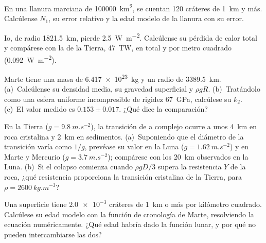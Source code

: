 \begin{exercise}[$\star$]\label{exo:b3:planetary-interiors-surfaces:3}
En una llanura marciana de \qty{100000}{km^2}, se cuentan 120 cráteres de \qty{1}{km} y
más. Calcúlense $N_1$, su error relativo y la edad modelo de la
llanura con su error.
\end{exercise}

\begin{exercise}[$\star$]\label{exo:b3:planetary-interiors-surfaces:4}
Io, de radio \qty{1821.5}{km}, pierde \qty{2.5}{W.m^{-2}}. Calcúlense su
pérdida de calor total y compárese con la de la Tierra, \qty{47}{TW}, en total y
por metro cuadrado (\qty{0.092}{W.m^{-2}}).
\end{exercise}

\begin{exercise}[$\star\star$]\label{exo:b3:planetary-interiors-surfaces:5}
Marte tiene una masa de \qty{6.417e23}{kg} y un radio de \qty{3389.5}{km}.
(a)~Calcúlense su densidad media, su gravedad superficial y $\rho gR$.
(b)~Tratándolo como una esfera uniforme incompresible de rigidez
\qty{67}{GPa}, calcúlese su  $k_2$. (c)~El valor medido es
$0.153 \pm 0.017$. ¿Qué dice la comparación?
\end{exercise}

\begin{exercise}[$\star\star$]\label{exo:b3:planetary-interiors-surfaces:6}
En la Tierra ($g = \qty{9.8}{m.s^{-2}}$), la transición de  a complejo
ocurre a unos \qty{4}{km} en roca cristalina y \qty{2}{km} en
sedimentos. (a)~Suponiendo que el diámetro de la transición varía como $1/g$,
prevéase su valor en la Luna ($g = \qty{1.62}{m.s^{-2}}$) y en Marte y
Mercurio ($g = \qty{3.7}{m.s^{-2}}$); compárese con los \qty{20}{km}
observados en la Luna. (b)~Si el colapso comienza cuando $\rho gD/3$ supera la
resistencia $Y$ de la roca, ¿qué resistencia proporciona la
transición cristalina de la Tierra, para $\rho = \qty{2600}{kg.m^{-3}}$?
\end{exercise}

\begin{exercise}[$\star\star$]\label{exo:b3:planetary-interiors-surfaces:7}
Una superficie tiene $\num{2.0e-3}$ cráteres de \qty{1}{km} o más por
kilómetro cuadrado. Calcúlese su edad modelo con la función de cronología de Marte,
resolviendo la ecuación numéricamente. ¿Qué edad habría dado la función lunar,
y por qué no pueden intercambiarse las dos?
\end{exercise}

